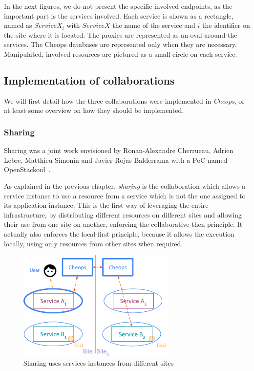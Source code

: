 In the next figures, we do not present the specific involved
endpoints, as the important part is the services involved.
%
Each service is shown as a rectangle, named as $Service X_i$ with
$Service X$ the name of the service and $i$ the identifier on the site
where it is located.
%
The proxies are represented as an oval around the services.
%
The Cheops databases are represented only when they are necessary.
%
Manipulated, involved resources are pictured as a small circle on
each service.

\subsection{Implementation of collaborations}
\label{subsec:collab-implem}


We will first detail how the three collaborations were implemented in
\emph{Cheops}, or at least some overview on how they should be
implemented.
%

\subsubsection{Sharing}

Sharing was a joint work envisioned by Ronan-Alexandre Cherrueau,
Adrien Lebre, Matthieu Simonin and Javier Rojas Balderrama with a
\acrshort{PoC} named OpenStackoïd~\cite{oid, CLRB19, CDLR+20}.
%

As explained in the previous chapter, \emph{sharing} is the
collaboration which allows a service instance to use a resource from a
service which is not the one assigned to its application instance.
%
This is the first way of leveraging the entire infrastructure, by
distributing different resources on different sites and allowing their
use from one site on another, enforcing the collaborative-then
principle.
%
It actually also enforces the local-first principle, because it allows
the execution locally, using only resources from other sites when
required.

\begin{figure}
  \centering
  \includegraphics[width=0.7\textwidth]{figs/pdf/cheops-sharing}
  \caption{Sharing uses services instances from different sites}
  \label{fig:cheops-sharing}
\end{figure}

